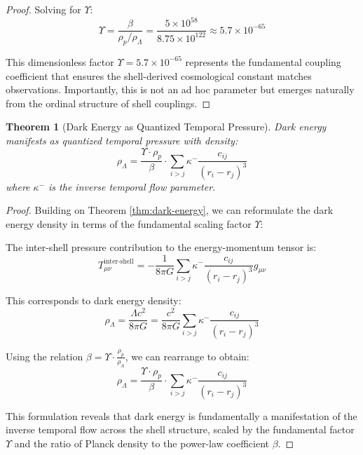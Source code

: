 \documentclass[12pt,a4paper]{article}
\newtheorem{theorem}{Theorem}[section]
\begin{document}
\begin{proof}
Solving for $\Upsilon$:
\begin{equation}
\Upsilon = \frac{\beta}{\rho_p/\rho_\Lambda} = \frac{5 \times 10^{58}}{8.75 \times 10^{122}} \approx 5.7 \times 10^{-65}
\end{equation}

This dimensionless factor $\Upsilon = 5.7 \times 10^{-65}$ represents the fundamental coupling coefficient that ensures the shell-derived cosmological constant matches observations. Importantly, this is not an ad hoc parameter but emerges naturally from the ordinal structure of shell couplings.
\end{proof}

\begin{theorem}[Dark Energy as Quantized Temporal Pressure]
\label{thm:quantized-pressure}
Dark energy manifests as quantized temporal pressure with density:
\begin{equation}
\rho_{\Lambda} = \frac{\Upsilon \cdot \rho_p}{\beta} \cdot \sum_{i>j} \kappa^- \frac{c_{ij}}{(r_i - r_j)^3}
\end{equation}
where $\kappa^-$ is the inverse temporal flow parameter.
\end{theorem}

\begin{proof}
Building on Theorem \ref{thm:dark-energy}, we can reformulate the dark energy density in terms of the fundamental scaling factor $\Upsilon$:

The inter-shell pressure contribution to the energy-momentum tensor is:
\begin{equation}
T_{\mu\nu}^{\text{inter-shell}} = -\frac{1}{8\pi G} \sum_{i>j} \kappa^- \frac{c_{ij}}{(r_i - r_j)^3} g_{\mu\nu}
\end{equation}

This corresponds to dark energy density:
\begin{equation}
\rho_{\Lambda} = \frac{\Lambda c^2}{8\pi G} = \frac{c^2}{8\pi G} \sum_{i>j} \kappa^- \frac{c_{ij}}{(r_i - r_j)^3}
\end{equation}

Using the relation $\beta = \Upsilon \cdot \frac{\rho_p}{\rho_\Lambda}$, we can rearrange to obtain:
\begin{equation}
\rho_{\Lambda} = \frac{\Upsilon \cdot \rho_p}{\beta} \cdot \sum_{i>j} \kappa^- \frac{c_{ij}}{(r_i - r_j)^3}
\end{equation}

This formulation reveals that dark energy is fundamentally a manifestation of the inverse temporal flow across the shell structure, scaled by the fundamental factor $\Upsilon$ and the ratio of Planck density to the power-law coefficient $\beta$.
\end{proof}
\end{document}
